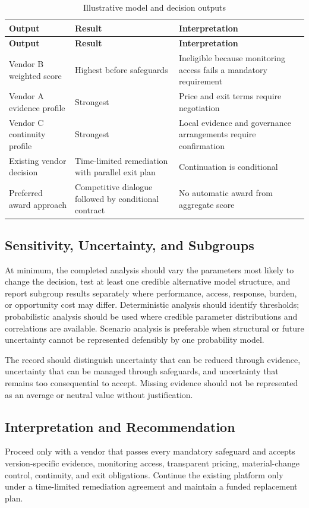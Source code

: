 \begin{longtable}{@{}p{}p{}p{}@{}}
\caption{Illustrative model and decision outputs}
\label{tab:comp-ch09-outputs}\\
\toprule
\textbf{Output} & \textbf{Result} & \textbf{Interpretation} \\
\midrule
\endfirsthead
\toprule
\textbf{Output} & \textbf{Result} & \textbf{Interpretation} \\
\midrule
\endhead
\bottomrule
\endlastfoot
Vendor B weighted score & Highest before safeguards & Ineligible because monitoring access fails a mandatory requirement \\
Vendor A evidence profile & Strongest & Price and exit terms require negotiation \\
Vendor C continuity profile & Strongest & Local evidence and governance arrangements require confirmation \\
Existing vendor decision & Time-limited remediation with parallel exit plan & Continuation is conditional \\
Preferred award approach & Competitive dialogue followed by conditional contract & No automatic award from aggregate score \\
\end{longtable}

\subsection{Sensitivity, Uncertainty, and Subgroups}
At minimum, the completed analysis should vary the parameters most likely to
change the decision, test at least one credible alternative model structure, and
report subgroup results separately where performance, access, response, burden,
or opportunity cost may differ. Deterministic analysis should identify thresholds;
probabilistic analysis should be used where credible parameter distributions and
correlations are available. Scenario analysis is preferable when structural or
future uncertainty cannot be represented defensibly by one probability model.

The record should distinguish uncertainty that can be reduced through evidence,
uncertainty that can be managed through safeguards, and uncertainty that remains
too consequential to accept. Missing evidence should not be represented as an
average or neutral value without justification.

\subsection{Interpretation and Recommendation}
Proceed only with a vendor that passes every mandatory safeguard and accepts version-specific evidence, monitoring access, transparent pricing, material-change control, continuity, and exit obligations. Continue the existing platform only under a time-limited remediation agreement and maintain a funded replacement plan.

